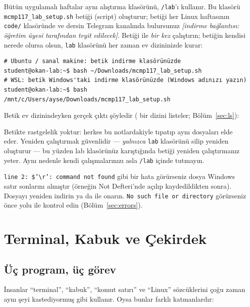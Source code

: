 Bütün uygulamalı haftalar aynı alıştırma klasörünü, \texttt{\tl/lab}'ı kullanır. Bu klasörü \texttt{mcmp117\_lab\_setup.sh} betiği (script) oluşturur; betiği her Linux haftasının \texttt{code/} klasöründe ve dersin Telegram kanalında bulursunuz \emph{[indirme bağlantısı: öğretim üyesi tarafından teyit edilecek]}. Betiği  ile \emph{bir kez} çalıştırın; betiğin kendisi nerede olursa olsun, \texttt{lab} klasörünü her zaman ev dizininizde kurar:

\begin{lstlisting}[style=term]
# Ubuntu / sanal makine: betik indirme klasörünüzde
student@okan-lab:~$ bash ~/Downloads/mcmp117_lab_setup.sh
# WSL: betik Windows'taki indirme klasörünüzde (Windows adınızı yazın)
student@okan-lab:~$ bash /mnt/c/Users/ayse/Downloads/mcmp117_lab_setup.sh
\end{lstlisting}

Betik ev dizinindeyken gerçek çıktı şöyledir ( bir dizini listeler; Bölüm~\ref{sec:ls}):

Betikte rastgelelik yoktur: herkes bu notlardakiyle tıpatıp aynı dosyaları elde eder. Yeniden çalıştırmak güvenlidir --- \emph{yalnızca} \texttt{lab} klasörünü silip yeniden oluşturur --- bu yüzden lab klasörünüz karıştığında betiği yeniden çalıştırmanız yeter. Aynı nedenle kendi çalışmalarınızı asla \texttt{\tl/lab} içinde tutmayın.

\begin{tryit}
\texttt{line 2: \$'\textbackslash r': command not found} gibi bir hata görürseniz dosya Windows satır sonlarını almıştır (örneğin Not Defteri'nde açılıp kaydedildikten sonra). Dosyayı yeniden indirin ya da  ile onarın. \texttt{No such file or directory} görürseniz önce yolu  ile kontrol edin (Bölüm~\ref{sec:errors}).
\end{tryit}

\section{Terminal, Kabuk ve Çekirdek}

\subsection{Üç program, üç görev}

İnsanlar ``terminal'', ``kabuk'', ``komut satırı'' ve ``Linux'' sözcüklerini çoğu zaman aynı şeyi kastediyormuş gibi kullanır. Oysa bunlar farklı katmanlardır:

